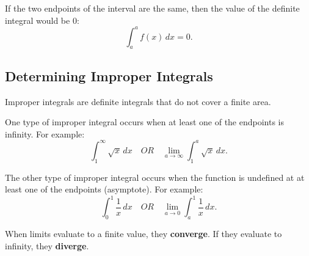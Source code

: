 \documentclass[12pt]{article}
\begin{document}
If the two endpoints of the interval are the same, then the value of the definite integral would be $0$:
\[ \int_{a}^{a} f(x) \, dx = 0. \]

\subsection{Determining Improper Integrals}
\noindent Improper integrals are definite integrals that do not cover a finite area.

One type of improper integral occurs when at least one of the endpoints is infinity. For example:
\[ \int_{1}^{\infty} \sqrt{x} \, dx \quad OR \quad \lim_{a \to \infty} \int_{1}^{a} \sqrt{x} \, dx. \]

The other type of improper integral occurs when the function is undefined at at least one of the endpoints (asymptote). For example:
\[ \int_{0}^{1} \frac{1}{x} \, dx \quad OR \quad \lim_{a \to 0} \int_{a}^{1} \frac{1}{x} \, dx. \]

When limits evaluate to a finite value, they \textbf{converge}. If they evaluate to infinity, they \textbf{diverge}.
\end{document}
